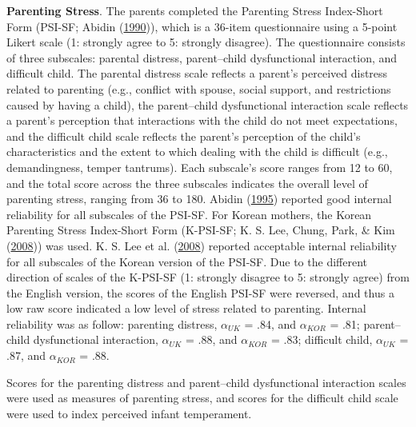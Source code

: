 \documentclass[
]{article}
\begin{document}
\textbf{Parenting Stress}. The parents completed the Parenting Stress Index-Short Form (PSI-SF; Abidin (\protect\hyperlink{ref-Abidin1990}{1990})), which is a 36-item questionnaire using a 5-point Likert scale (1: strongly agree to 5: strongly disagree). The questionnaire consists of three subscales: parental distress, parent--child dysfunctional interaction, and difficult child. The parental distress scale reflects a parent's perceived distress related to parenting (e.g., conflict with spouse, social support, and restrictions caused by having a child), the parent--child dysfunctional interaction scale reflects a parent's perception that interactions with the child do not meet expectations, and the difficult child scale reflects the parent's perception of the child's characteristics and the extent to which dealing with the child is difficult (e.g., demandingness, temper tantrums). Each subscale's score ranges from 12 to 60, and the total score across the three subscales indicates the overall level of parenting stress, ranging from 36 to 180. Abidin (\protect\hyperlink{ref-Abidin1995}{1995}) reported good internal reliability for all subscales of the PSI-SF. For Korean mothers, the Korean Parenting Stress Index-Short Form (K-PSI-SF; K. S. Lee, Chung, Park, \& Kim (\protect\hyperlink{ref-Lee2008b}{2008})) was used. K. S. Lee et al. (\protect\hyperlink{ref-Lee2008b}{2008}) reported acceptable internal reliability for all subscales of the Korean version of the PSI-SF. Due to the different direction of scales of the K-PSI-SF (1: strongly disagree to 5: strongly agree) from the English version, the scores of the English PSI-SF were reversed, and thus a low raw score indicated a low level of stress related to parenting. Internal reliability was as follow: parenting distress, \(\alpha_{UK}\) = .84, and \(\alpha_{KOR}\) = .81; parent--child dysfunctional interaction, \(\alpha_{UK}\) = .88, and \(\alpha_{KOR}\) = .83; difficult child, \(\alpha_{UK}\) = .87, and \(\alpha_{KOR}\) = .88.

Scores for the parenting distress and parent--child dysfunctional interaction scales were used as measures of parenting stress, and scores for the difficult child scale were used to index perceived infant temperament.
\end{document}
